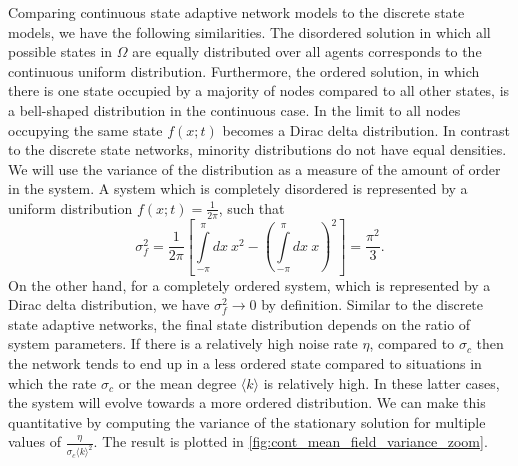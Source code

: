 Comparing continuous state adaptive network models to the discrete state models, we have the following similarities. The disordered solution in which all possible states in $\Omega$ are equally distributed over all agents corresponds to the continuous uniform distribution. Furthermore, the ordered solution, in which there is one state occupied by a majority of nodes compared to all other states, is a bell-shaped distribution in the continuous case. In the limit to all nodes occupying the same state $f(x;t)$ becomes a Dirac delta distribution. In contrast to the discrete state networks, minority distributions do not have equal densities. We will use the variance of the distribution as a measure of the amount of order in the system. A system which is completely disordered is represented by a uniform distribution $f(x;t)=\frac{1}{2\pi}$, such that 
\begin{equation}
\sigma_f^2= \frac{1}{2\pi} \left[ \int\limits_{-\pi}^\pi dx\ x^2 - \left( \int\limits_{-\pi}^\pi dx\ x \right)^2 \right] = \frac{\pi^2}{3}.
\end{equation}
On the other hand, for a completely ordered system, which is represented by a Dirac delta distribution, we have $\sigma_f^2 \to 0$ by definition. Similar to the discrete state adaptive networks, the final state distribution depends on the ratio of system parameters. If there is a relatively high noise rate $\eta$, compared to $\sigma_c$ then the network tends to end up in a less ordered state compared to situations in which the rate $\sigma_c$ or the mean degree $\langle k \rangle$ is relatively high. In these latter cases, the system will evolve towards a more ordered distribution. We can make this quantitative by computing the variance of the stationary solution for multiple values of $\frac{\eta}{\sigma_c\langle k \rangle^2}$. The result is plotted in \cref{fig:cont_mean_field_variance_zoom}.

